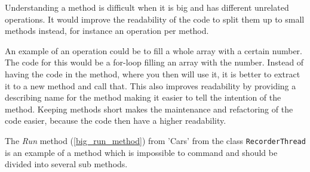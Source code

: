 Understanding a method is difficult when it is big and has different unrelated operations.
It would improve the readability of the code to split them up to small methods instead, for instance an operation per method.

An example of an operation could be to fill a whole array with a certain number.
The code for this would be a for-loop filling an array with the number.
Instead of having the code in the method, where you then will use it, it is better to extract it to a new method and call that.
This also improves readability by providing a describing name for the method making it easier to tell the intention of the method.
Keeping methods short makes the maintenance and refactoring of the code easier, because the code then have a higher readability.

The \textit{Run} method (\cref{big_run_method}) from 'Cars' from the class \lstinline!RecorderThread! is an example of a method which is impossible to command and should be divided into several sub methods.